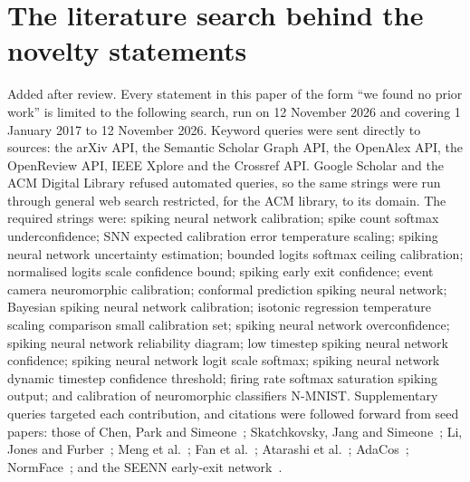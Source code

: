 \documentclass[10pt]{article}
\begin{document}


\section{The literature search behind the novelty statements}
\label{app:search}

Added after review. Every statement in this paper of the form ``we found no prior work'' is
limited to the following search, run on 12 November 2026 and covering 1 January 2017 to 12 November %
2026. Keyword queries were sent directly to \lsSourcesDirect{} sources: the arXiv API, the %
Semantic Scholar Graph API, the OpenAlex API, the OpenReview API, IEEE Xplore and the Crossref API.
Google Scholar and the ACM Digital Library refused automated queries, so the same strings were run
through general web search restricted, for the ACM library, to its domain. The \lsQueries{} %
required strings were: spiking neural network calibration; spike count softmax underconfidence;
SNN expected calibration error temperature scaling; spiking neural network uncertainty
estimation; bounded logits softmax ceiling calibration; normalised logits scale confidence bound;
spiking early exit confidence; event camera neuromorphic calibration; conformal prediction
spiking neural network; Bayesian spiking neural network calibration; isotonic regression
temperature scaling comparison small calibration set; spiking neural network overconfidence;
spiking neural network reliability diagram; low timestep spiking neural network confidence;
spiking neural network logit scale softmax; spiking neural network dynamic timestep confidence
threshold; firing rate softmax saturation spiking output; and calibration of neuromorphic
classifiers N-MNIST. Supplementary queries targeted each contribution, and citations were followed
forward from \lsSeeds{} seed papers: those of Chen, Park and Simeone~\citep{chen2024agreeing,chen2025knowing}; %
Skatchkovsky, Jang and Simeone~\citep{skatchkovsky2022bayesian}; Li, Jones and Furber~\citep{li2023dynamic};
Meng et al.~\citep{meng2022dsr}; Fan et al.~\citep{fan2024sfod}; Atarashi et al.~\citep{atarashi2025bounding};
AdaCos~\citep{zhang2019adacos}; NormFace~\citep{wang2017normface}; and the SEENN early-exit
network~\citep{li2023seenn}.
\end{document}
